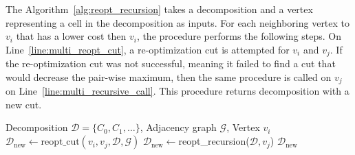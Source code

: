 \documentclass[../main.tex]{subfiles}
\begin{document}
The Algorithm~\ref{alg:reopt_recursion} takes a decomposition and a vertex representing a cell in the decomposition as inputs. For each neighboring vertex to $v_i$ that has a lower cost then $v_i$, the procedure performs the following steps. On Line~\ref{line:multi_reopt_cut}, a re-optimization cut is attempted for $v_i$ and $v_j$. If the re-optimization cut was not successful, meaning it failed to find a cut that would decrease the pair-wise maximum, then the same procedure is called on $v_j$ on Line~\ref{line:multi_recursive_call}. This procedure returns decomposition with a new cut.

\begin{algorithm}
	\caption{$\text{reopt\_recursion}(\mathcal{D}, \mathcal{G}, v_i)$}
	\label{alg:reopt_recursion}
	\begin{algorithmic}[1]
		\REQUIRE Decomposition $\mathcal{D}=\{C_0,C_1,\ldots\}$, Adjacency graph $\mathcal{G}$, Vertex $v_i$
					\STATE $\mathcal{D}_{\text{new}}\gets\text{reopt\_cut}(v_i,v_j,\mathcal{D},\mathcal{G})$ \label{line:multi_reopt_cut}
						\STATE $\mathcal{D}_{\text{new}}\gets$reopt\_recursion($\mathcal{D},v_j$)\label{line:multi_recursive_call}
					\ENDIF
					\RETURN $\mathcal{D}_{\text{new}}$
				\ENDIF
			\ENDFOR
	\end{algorithmic}
\end{algorithm}




\end{document}
